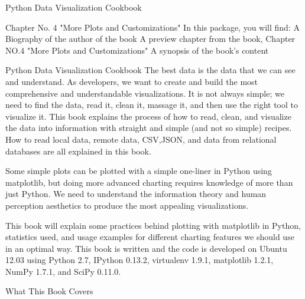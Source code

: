Python Data Visualization Cookbook



Chapter No. 4
"More Plots and Customizations"
In this package, you will find:
A Biography of the author of the book
A preview chapter from the book, Chapter NO.4 "More Plots and Customizations"
A synopsis of the book’s content

\newpage %
Python Data Visualization Cookbook 
The best data is the data that we can see and understand. As developers, we want to
create and build the most comprehensive and understandable visualizations. It is not
always simple; we need to find the data, read it, clean it, massage it, and then use the
right tool to visualize it. This book explains the process of how to read, clean, and
visualize the data into information with straight and simple (and not so simple) recipes.
How to read local data, remote data, CSV,JSON, and data from relational databases
are all explained in this book.

Some simple plots can be plotted with a simple one-liner in Python using matplotlib,
but doing more advanced charting requires knowledge of more than just Python. We
need to understand the information theory and human perception aesthetics to produce
the most appealing visualizations.

This book will explain some practices behind plotting with matplotlib in Python, statistics
used, and usage examples for different charting features we should use in an optimal way.
This book is written and the code is developed on Ubuntu 12.03 using Python 2.7,
IPython 0.13.2, virtualenv 1.9.1, matplotlib 1.2.1, NumPy 1.7.1, and SciPy 0.11.0.

What This Book Covers

